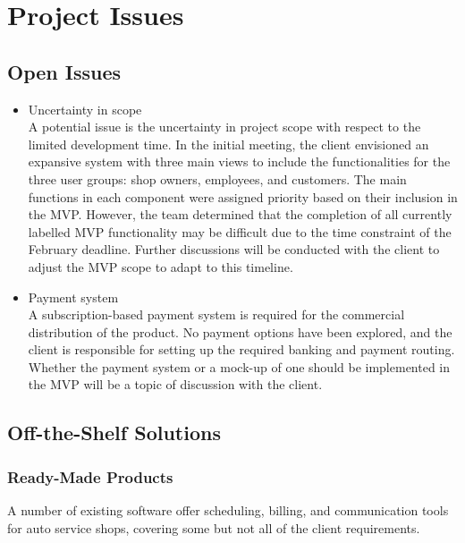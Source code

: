 \documentclass[12pt]{article}
\begin{document}

\newpage

\section{Project Issues}

\subsection{Open Issues}
\begin {itemize}
    \item Uncertainty in scope \\ 
    A potential issue is the uncertainty in project scope with respect to the 
    limited development time. In the initial meeting, the client envisioned an 
    expansive system with three main views to include the functionalities for 
    the three user groups: shop owners, employees, and customers. The main 
    functions in each component were assigned priority based on their inclusion 
    in the MVP. However, the team determined that the completion of all 
    currently labelled MVP functionality may be difficult due to the time 
    constraint of the February deadline. Further discussions will be conducted 
    with the client to adjust the MVP scope to adapt to this timeline.
    
    \item Payment system\\
    A subscription-based payment system is required for the commercial 
    distribution of the product. No payment options have been explored, and the 
    client is responsible for setting up the required banking and payment 
    routing. Whether the payment system or a mock-up of one should be 
    implemented in the MVP will be a topic of discussion with the client.
\end {itemize}

\subsection{Off-the-Shelf Solutions}

\subsubsection{Ready-Made Products}
A number of existing software offer scheduling, billing, and communication 
tools for auto service shops, covering some but not all of the client 
requirements.
\end{document}
